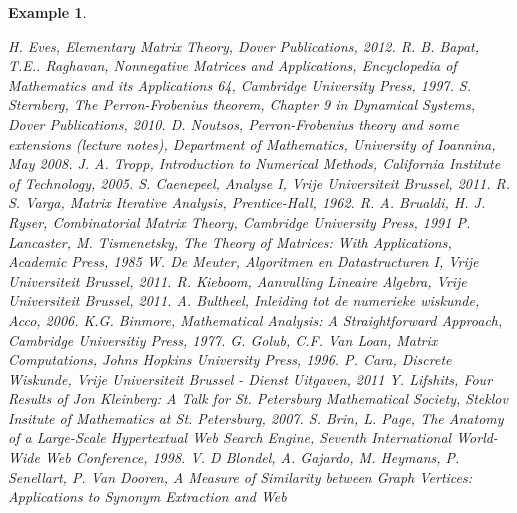 \documentclass[a4paper,11pt]{report}
\newtheorem{example}[theorem]{Example}
\begin{document}
\begin{example}
   \newpage
\begin{thebibliography}{99}
 H. Eves, \emph{Elementary Matrix Theory}, Dover Publications, 
2012.
\bibitem[BAPAT] R. B. Bapat, T.E.. Raghavan, \emph{Nonnegative Matrices and 
Applications}, Encyclopedia of Mathematics and its Applications 64, Cambridge University Press, 1997. 
 S. Sternberg, \emph{The Perron-Frobenius theorem}, Chapter 9 in Dynamical Systems, Dover Publications, 2010.
 D. Noutsos, \emph{Perron-Frobenius theory and some extensions} (lecture notes), Department of Mathematics, University of Ioannina, May 2008.
 J. A. Tropp, \emph{Introduction to Numerical Methods}, California Institute of 
Technology, 2005.
 S. Caenepeel, \emph{Analyse I}, Vrije Universiteit Brussel, 2011.
\bibitem[VARGA] R. S. Varga, \emph{Matrix Iterative Analysis}, Prentice-Hall, 1962. 
\bibitem[BRUALDI] R. A. Brualdi, H. J. Ryser, \emph{Combinatorial Matrix Theory}, Cambridge University 
Press, 1991
\bibitem[LANCASTER] P. Lancaster, M. Tismenetsky, \emph{The Theory of Matrices: With 
Applications}, Academic Press, 1985
 W. De Meuter, \emph{Algoritmen en Datastructuren I}, Vrije Universiteit Brussel, 2011.
 R. Kieboom, \emph{Aanvulling Lineaire Algebra}, Vrije Universiteit Brussel, 2011.
 A. Bultheel, \emph{Inleiding tot de numerieke wiskunde}, Acco, 
2006.
 K.G. Binmore, \emph{Mathematical Analysis: A Straightforward Approach}, Cambridge Universitiy Press, 1977.
 G. Golub, C.F. Van Loan, \emph{Matrix Computations}, 
Johns Hopkins University Press, 1996.
 P. Cara, \emph{Discrete Wiskunde}, Vrije Universiteit Brussel - Dienst 
Uitgaven, 2011
 Y. Lifshits, \emph{Four Results of Jon Kleinberg: A Talk for St. Petersburg Mathematical 
Society}, Steklov Insitute of Mathematics at St. Petersburg, 2007.
 S. Brin, L. Page, \emph{The Anatomy of a Large-Scale Hypertextual Web Search Engine}, Seventh International World-Wide Web Conference, 1998.
 V. D Blondel, A. Gajardo, M. Heymans, P. Senellart, P. Van Dooren, 
\emph{A Measure of Similarity between Graph Vertices: Applications to Synonym Extraction and Web 
}
\end{thebibliography}
\end{example}
\end{document}
